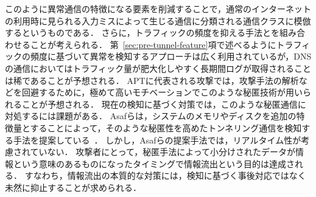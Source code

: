 このように異常通信の特徴になる要素を削減することで，通常のインターネットの利用時に見られる入力ミスによって生じる通信に分類される通信クラスに模倣するというものである．
さらに，トラフィックの頻度を抑える手法とを組み合わせることが考えられる．
第~\ref{sec:pre-tunnel-feature}項で述べるようにトラフィックの頻度に基づいて異常を検知するアプローチは広く利用されているが，DNSの通信においてはトラフィック量が肥大化しやすく長期間ログが取得されることは稀であることが予想される．
APTに代表される攻撃では，攻撃手法の解析などを回避するために，極めて高いモチベーションでこのような秘匿技術が用いられることが予想される．
現在の検知に基づく対策では，このような秘匿通信に対処するには課題がある．
Asafらは，システムのメモリやディスクを追加の特徴量とすることによって，そのような秘匿性を高めたトンネリング通信を検知する手法を提案している~\cite{asaf}．
しかし，Asafらの提案手法では，リアルタイム性が考慮されていない．
攻撃者にとって，秘匿手法によって小分けされたデータが情報という意味のあるものになったタイミングで情報流出という目的は達成される．
すなわち，情報流出の本質的な対策には，検知に基づく事後対応ではなく未然に抑止することが求められる．
